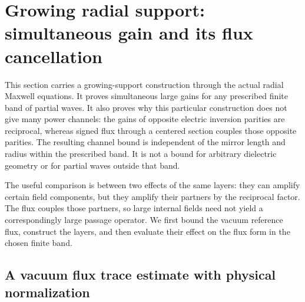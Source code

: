\section{Growing radial support: simultaneous gain and its flux cancellation}
\label{cg:section}

This section carries a growing-support construction through the actual
radial Maxwell equations.  It proves simultaneous large gains for any
prescribed finite band of partial waves.  It also proves why this
particular construction does not give many power channels: the gains
of opposite electric inversion parities are reciprocal, whereas signed
flux through a centered section couples those opposite parities.
The resulting channel bound is independent of the mirror length and
radius within the prescribed band.  It is not a bound for arbitrary
dielectric geometry or for partial waves outside that band.

The useful comparison is between two effects of the same layers: they can
amplify certain field components, but they amplify their partners by the
reciprocal factor. The flux couples those partners, so large internal fields
need not yield a correspondingly large passage operator. We first bound the
vacuum reference flux, construct the layers, and then evaluate their effect
on the flux form in the chosen finite band.

\subsection{A vacuum flux trace estimate with physical normalization}

